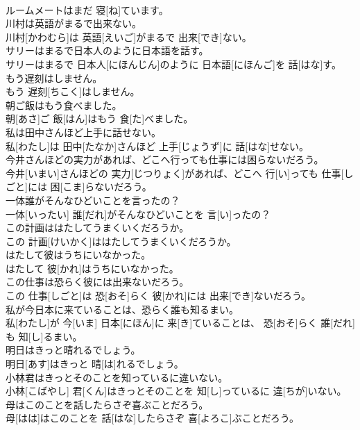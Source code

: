 \documentclass[8pt]{extreport}
\begin{document}
\begin{CJK}{UTF8}{min}
\\	ルームメートはまだ 寝[ね]ています。
\\	川村は英語がまるで出来ない。	
\\	川村[かわむら]は 英語[えいご]がまるで 出来[でき]ない。
\\	サリーはまるで日本人のように日本語を話す。	
\\	サリーはまるで 日本人[にほんじん]のように 日本語[にほんご]を 話[はな]す。
\\	もう遅刻はしません。	
\\	もう 遅刻[ちこく]はしません。
\\	朝ご飯はもう食べました。	
\\	朝[あさ]ご 飯[はん]はもう 食[た]べました。
\\	私は田中さんほど上手に話せない。	
\\	私[わたし]は 田中[たなか]さんほど 上手[じょうず]に 話[はな]せない。
\\	今井さんほどの実力があれば、どこへ行っても仕事には困らないだろう。	
\\	今井[いまい]さんほどの 実力[じつりょく]があれば、どこへ 行[い]っても 仕事[しごと]には 困[こま]らないだろう。
\\	一体誰がそんなひどいことを言ったの？	
\\	一体[いったい] 誰[だれ]がそんなひどいことを 言[い]ったの？
\\	この計画ははたしてうまくいくだろうか。	
\\	この 計画[けいかく]ははたしてうまくいくだろうか。
\\	はたして彼はうちにいなかった。	
\\	はたして 彼[かれ]はうちにいなかった。
\\	この仕事は恐らく彼には出来ないだろう。	
\\	この 仕事[しごと]は 恐[おそ]らく 彼[かれ]には 出来[でき]ないだろう。
\\	私が今日本に来ていることは、恐らく誰も知るまい。	
\\	私[わたし]が 今[いま] 日本[にほん]に 来[き]ていることは、 恐[おそ]らく 誰[だれ]も 知[し]るまい。
\\	明日はきっと晴れるでしょう。	
\\	明日[あす]はきっと 晴[は]れるでしょう。
\\	小林君はきっとそのことを知っているに違いない。	
\\	小林[こばやし] 君[くん]はきっとそのことを 知[し]っているに 違[ちが]いない。
\\	母はこのことを話したらさぞ喜ぶことだろう。	
\\	母[はは]はこのことを 話[はな]したらさぞ 喜[よろこ]ぶことだろう。

\end{CJK}
\end{document}
